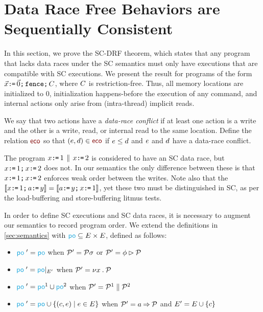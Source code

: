 \section{Data Race Free Behaviors are Sequentially Consistent}
\label{sec:sc}




In this section, we prove the SC-DRF theorem, which states that any program
that lacks data races under the SC semantics must only have executions that
are compatible with SC executions.  We present the result for programs of the
form $\vec{x}\texttt{:}\mkern-1mu\texttt{=}\,\vec{0}\texttt{;}\,\texttt{fence}\texttt{;}\,C$, where $C$ is
restriction-free.  Thus, all memory locations are initialized to $0$,
initialization happens-before the execution of any command, and internal actions only arise from (intra-thread) implicit reads.

We say that two actions have a \emph{data-race conflict} if at least one
action is a write and the other is a write, read, or internal read to the
same location.  Define the relation $\reco$ so that $(\aEv,\bEv)\in{\reco}$
if $e\leq d$ and $e$ and $d$ have a data-race conflict.

The program $x\texttt{:}\mkern-1mu\texttt{=}\,1\,\mathbin{\|}\, x\texttt{:}\mkern-1mu\texttt{=}\,2$ is considered to have an SC data race, but
$x\texttt{:}\mkern-1mu\texttt{=}\,1\texttt{;}\, x\texttt{:}\mkern-1mu\texttt{=}\,2$ does not.  In our semantics the only difference
between these is that $x\texttt{:}\mkern-1mu\texttt{=}\,1\texttt{;}\, x\texttt{:}\mkern-1mu\texttt{=}\,2$ enforces weak order between the
writes.  Note also that the
$\llbracket x\texttt{:}\mkern-1mu\texttt{=}\,1\texttt{;}\, a\texttt{:}\mkern-1mu\texttt{=}\, y\rrbracket=\llbracket a\texttt{:}\mkern-1mu\texttt{=}\, y\texttt{;}\, x\texttt{:}\mkern-1mu\texttt{=}\,1\rrbracket$, yet these two must
be distinguished in SC, as per the load-buffering and store-buffering litmus tests.

In order to define SC executions and SC data races, it is necessary to
augment our semantics to record program order.  We extend the definitions in
\textsection\ref{sec:semantics} with
${\rpox}\subseteq{\Event}\times{\Event}$, defined as follows:
\begin{itemize}
\item
  ${\rpox'} = {\rpox}$
  when $\mathcal{P}'=\mathcal{P}\sigma$
  or $\mathcal{P}'=\phi\mathbin\rhd\mathcal{P}$
\item
  ${\rpox'} = {\rpox}\restrict{\Event'}$
  when $\mathcal{P}'=\nu x\mathbin.\mathcal{P}$
\item
  ${\rpox'} = {\rpox}^1\cup{\rpox}^2$
  when $\mathcal{P}'=\mathcal{P}^1\parallel\mathcal{P}^2$
\item
  ${\rpox'} = {\rpox}\cup\{(\cEv,\aEv)\mid\aEv\in\Event\}$
  when $\mathcal{P}'=a\mathbin\Rightarrow\mathcal{P}$ and $E' = E \cup \{c\}$
\end{itemize}

